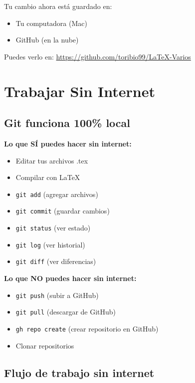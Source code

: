 \documentclass[11pt,a4paper]{article}
\begin{document}
\begin{successbox}[¡Listo!]
Tu cambio ahora está guardado en:
\begin{itemize}
  \item Tu computadora (Mac)
  \item GitHub (en la nube)
\end{itemize}

Puedes verlo en: \url{https://github.com/toribio99/LaTeX-Varios}
\end{successbox}

\section{Trabajar Sin Internet}

\subsection{Git funciona 100\% local}

\textbf{Lo que SÍ puedes hacer sin internet:}
\begin{itemize}
  \item Editar tus archivos .tex
  \item Compilar con LaTeX
  \item \texttt{git add} (agregar archivos)
  \item \texttt{git commit} (guardar cambios)
  \item \texttt{git status} (ver estado)
  \item \texttt{git log} (ver historial)
  \item \texttt{git diff} (ver diferencias)
\end{itemize}

\textbf{Lo que NO puedes hacer sin internet:}
\begin{itemize}
  \item \texttt{git push} (subir a GitHub)
  \item \texttt{git pull} (descargar de GitHub)
  \item \texttt{gh repo create} (crear repositorio en GitHub)
  \item Clonar repositorios
\end{itemize}

\subsection{Flujo de trabajo sin internet}
\end{document}
